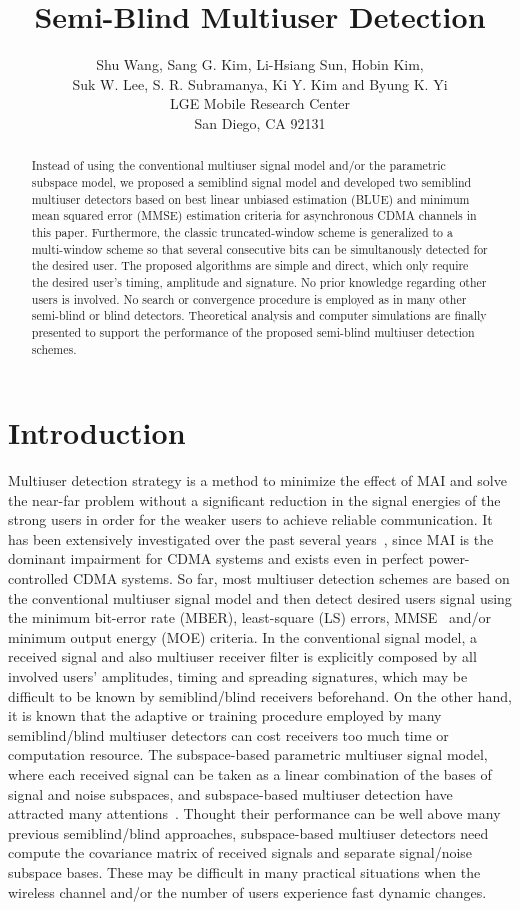 \documentclass[a4paper,10pt,fleqn, twocolumn]{IEEETran}
\title{ Semi-Blind Multiuser Detection }
\date{}
\author{Shu Wang, Sang G. Kim, Li-Hsiang Sun, Hobin Kim,\\
   Suk W. Lee, S. R. Subramanya, Ki Y. Kim and Byung K. Yi\\LGE Mobile Research Center\\San Diego, CA 92131}
\begin{document}
\maketitle

\begin{abstract}
Instead of using the conventional multiuser signal model and/or
the parametric subspace model, we proposed a semiblind signal
model and developed two semiblind multiuser detectors based on
best linear unbiased estimation (BLUE) and minimum mean squared
error (MMSE) estimation criteria for asynchronous CDMA channels in
this paper. Furthermore, the classic truncated-window scheme is
generalized to a multi-window scheme so that several consecutive
bits can be simultanously detected for the desired user. The
proposed algorithms are simple and direct, which only require the
desired user's timing, amplitude and signature. No prior knowledge
regarding other users is involved. No search or convergence
procedure is employed as in many other semi-blind or blind
detectors. Theoretical analysis and computer simulations are
finally presented to support the performance of the proposed
semi-blind multiuser detection schemes.
\end{abstract}

\section{Introduction}
Multiuser detection strategy is a method to minimize the effect of
MAI and solve the near-far problem without a significant reduction
in the signal energies of the strong users in order for the weaker
users to achieve reliable communication. It has been extensively
investigated over the past several years~\cite{Verd98}, since MAI
is the dominant impairment for CDMA systems and exists even in
perfect power-controlled CDMA systems. So far, most multiuser
detection schemes are based on the conventional multiuser signal
model and then detect desired users signal using the minimum
bit-error rate (MBER), least-square (LS) errors,
MMSE~\cite{Lupa89} and/or minimum output energy (MOE) criteria. In
the conventional signal model, a received signal and also
multiuser receiver filter is explicitly composed by all involved
users' amplitudes, timing and spreading signatures, which may be
difficult to be known by semiblind/blind receivers beforehand. On
the other hand, it is known that the adaptive or training
procedure employed by many semiblind/blind multiuser detectors can
cost receivers too much time or computation resource. The
subspace-based parametric multiuser signal model, where each
received signal can be taken as a linear combination of the bases
of signal and noise subspaces, and subspace-based multiuser
detection have attracted many attentions~\cite{Wang98}. Thought
their performance can be well above many previous semiblind/blind
approaches, subspace-based multiuser detectors need compute the
covariance matrix of received signals and separate signal/noise
subspace bases. These may be difficult in many practical
situations when the wireless channel and/or the number of users
experience fast dynamic changes.
\end{document}
